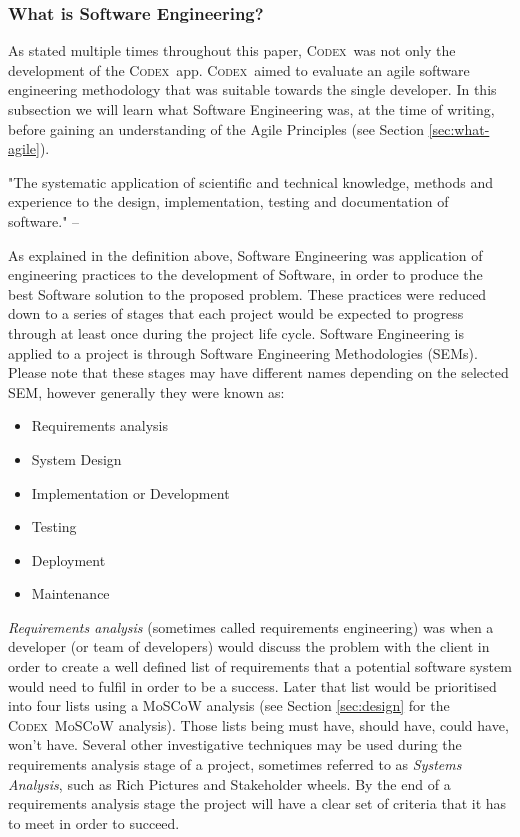 \documentclass[final]{cmpreport}
\newcommand{\Codex}{\textsc{Codex}}
\begin{document}
			\subsubsection{What is Software Engineering?} \label{sec:what-se}
			As stated multiple times throughout this paper, \Codex \ was not only the development of the \Codex \ app. \Codex \ aimed to evaluate an agile software engineering methodology that was suitable towards the single developer. In this subsection we will learn what Software Engineering was, at the time of writing, before gaining an understanding of the Agile Principles (see Section \ref{sec:what-agile}). 
			
			\begin{displayquote}
				"The systematic application of scientific and technical knowledge, methods and experience to the design, implementation, testing and documentation of software." -- \cite{SE-def}
			\end{displayquote}
		
			As explained in the definition above, Software Engineering was application of engineering practices to the development of Software, in order to produce the best Software solution to the proposed problem. These practices were reduced down to a series of stages that each project would be expected to progress through at least once during the project life cycle. Software Engineering is applied to a project is through Software Engineering Methodologies (SEMs). Please note that these stages may have different names depending on the selected SEM, however generally they were known as:
			
			\begin{itemize}
				\item Requirements analysis
				\item System Design
				\item Implementation or Development
				\item Testing
				\item Deployment
				\item Maintenance				
			\end{itemize}
		
			\emph{Requirements analysis} (sometimes called requirements engineering) was when a developer (or team of developers) would discuss the problem with the client in order to create a well defined list of requirements that a potential software system would need to fulfil in order to be a success. Later that list would be prioritised into four lists using a MoSCoW analysis (see Section \ref{sec:design} for the \Codex \ MoSCoW analysis). Those lists being must have, should have, could have, won't have. Several other investigative techniques may be used during the requirements analysis stage of a project, sometimes referred to as \emph{Systems Analysis}, such as Rich Pictures and Stakeholder wheels. By the end of a requirements analysis stage the project will have a clear set of criteria that it has to meet in order to succeed.
			
\end{document}
